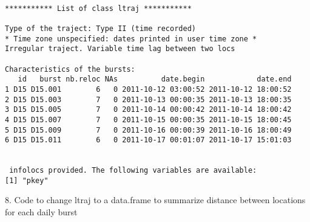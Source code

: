 \documentclass[
  letterpaper,
]{book}
\newenvironment{Shaded}{\begin{snugshade}}{\end{snugshade}}
\newcommand{\AttributeTok}[1]{\textcolor[rgb]{0.40,0.45,0.13}{#1}}
\newcommand{\CommentTok}[1]{\textcolor[rgb]{0.37,0.37,0.37}{#1}}
\newcommand{\ControlFlowTok}[1]{\textcolor[rgb]{0.00,0.23,0.31}{#1}}
\newcommand{\FunctionTok}[1]{\textcolor[rgb]{0.28,0.35,0.67}{#1}}
\newcommand{\NormalTok}[1]{\textcolor[rgb]{0.00,0.23,0.31}{#1}}
\newcommand{\OtherTok}[1]{\textcolor[rgb]{0.00,0.23,0.31}{#1}}
\newcommand{\SpecialCharTok}[1]{\textcolor[rgb]{0.37,0.37,0.37}{#1}}
\begin{document}
\begin{verbatim}

*********** List of class ltraj ***********

Type of the traject: Type II (time recorded)
* Time zone unspecified: dates printed in user time zone *
Irregular traject. Variable time lag between two locs

Characteristics of the bursts:
   id   burst nb.reloc NAs          date.begin            date.end
1 D15 D15.001        6   0 2011-10-12 03:00:52 2011-10-12 18:00:52
2 D15 D15.003        7   0 2011-10-13 00:00:35 2011-10-13 18:00:35
3 D15 D15.005        7   0 2011-10-14 00:00:42 2011-10-14 18:00:42
4 D15 D15.007        7   0 2011-10-15 00:00:35 2011-10-15 18:00:45
5 D15 D15.009        7   0 2011-10-16 00:00:39 2011-10-16 18:00:49
6 D15 D15.011        6   0 2011-10-17 00:01:07 2011-10-17 15:01:03


 infolocs provided. The following variables are available:
[1] "pkey"
\end{verbatim}

8. Code to change ltraj to a data.frame to summarize distance between
locations for each daily burst

\begin{Shaded}
\end{Shaded}
\end{document}
